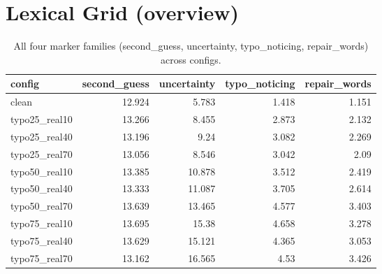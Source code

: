 \documentclass[11pt]{article}
\begin{document}
\section*{Lexical Grid (overview)}
\begin{table}[H]
\centering
\caption{All four marker families (second\_guess, uncertainty, typo\_noticing, repair\_words) across configs.}
\small
\begin{adjustbox}{max width=\textwidth}
\begin{tabular}{lrrrr}
\toprule
\textbf{config} & \textbf{second\_guess} & \textbf{uncertainty} & \textbf{typo\_noticing} & \textbf{repair\_words} \\
\midrule
clean & 12.924 & 5.783 & 1.418 & 1.151 \\
typo25\_real10 & 13.266 & 8.455 & 2.873 & 2.132 \\
typo25\_real40 & 13.196 & 9.24 & 3.082 & 2.269 \\
typo25\_real70 & 13.056 & 8.546 & 3.042 & 2.09 \\
typo50\_real10 & 13.385 & 10.878 & 3.512 & 2.419 \\
typo50\_real40 & 13.333 & 11.087 & 3.705 & 2.614 \\
typo50\_real70 & 13.639 & 13.465 & 4.577 & 3.403 \\
typo75\_real10 & 13.695 & 15.38 & 4.658 & 3.278 \\
typo75\_real40 & 13.629 & 15.121 & 4.365 & 3.053 \\
typo75\_real70 & 13.162 & 16.565 & 4.53 & 3.426 \\
\bottomrule
\end{tabular}
\end{adjustbox}
\end{table}
\end{document}
